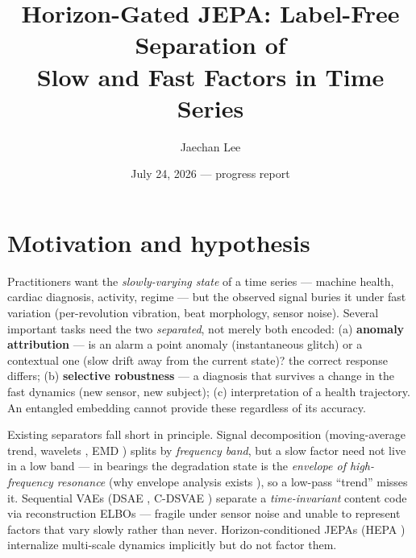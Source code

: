 \documentclass[10pt,twocolumn]{article}
\title{\vspace{-6mm}\large\bf Horizon-Gated JEPA: Label-Free Separation of\\
Slow and Fast Factors in Time Series}
\author{Jaechan Lee}
\date{July 24, 2026 --- progress report}
\begin{document}
\maketitle
\vspace{-8mm}

\section{Motivation and hypothesis}
Practitioners want the \emph{slowly-varying state} of a time series ---
machine health, cardiac diagnosis, activity, regime --- but the observed
signal buries it under fast variation (per-revolution vibration, beat
morphology, sensor noise). Several important tasks need the two \emph{separated},
not merely both encoded: (a) \textbf{anomaly attribution} --- is an alarm a
point anomaly (instantaneous glitch) or a contextual one (slow drift away from
the current state)? the correct response differs; (b) \textbf{selective
robustness} --- a diagnosis that survives a change in the fast dynamics (new
sensor, new subject); (c) interpretation of a health trajectory. An entangled
embedding cannot provide these regardless of its accuracy.

Existing separators fall short in principle. Signal decomposition
(moving-average trend, wavelets \cite{mallat1999wavelet}, EMD
\cite{huang1998empirical}) splits by \emph{frequency band}, but a
slow factor need not live in a low band --- in bearings the degradation state
is the \emph{envelope of high-frequency resonance} (why envelope analysis
exists \cite{randall2011rolling}), so a low-pass ``trend'' misses it.
Sequential VAEs (DSAE \cite{hsu2017unsupervised}, C-DSVAE
\cite{bai2021contrastively}) separate a \emph{time-invariant} content code via
reconstruction ELBOs --- fragile under sensor noise and unable to represent
factors that vary slowly rather than never. Horizon-conditioned JEPAs (HEPA
\cite{hepa2026}) internalize multi-scale dynamics implicitly but do not factor
them.
\end{document}
